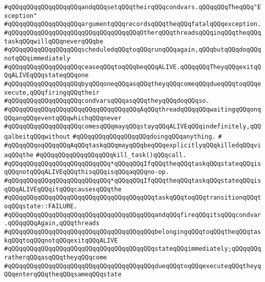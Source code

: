 \verb|#qQQqqQQqqQQqqQQqqQQqandqQQqsetqQQqtheirqQQqcondvars.qQQqqQQqTheqQQq"Exception"|\newline
\verb|#qQQqqQQqqQQqqQQqqQQqargumentqQQqrecordsqQQqtheqQQqfatalqQQqexception.|\newline
\verb|#qQQqqQQqqQQqqQQqqQQqqQQqqQQqqQQqqQQqOtherqQQqthreadsqQQqinqQQqtheqQQqtaskqQQqwillqQQqneverqQQqbe|\newline
\verb|#qQQqqQQqqQQqqQQqqQQqscheduledqQQqtoqQQqrunqQQqagain,qQQqbutqQQqdoqQQqnotqQQqimmediately|\newline
\verb|#qQQqqQQqqQQqqQQqqQQqceaseqQQqtoqQQqbeqQQqALIVE.qQQqqQQqTheyqQQqexitqQQqALIVEqQQqstateqQQqone|\newline
\verb|#qQQqqQQqqQQqqQQqqQQqbyqQQqoneqQQqasqQQqtheyqQQqcomeqQQqdueqQQqtoqQQqexecute,qQQqfiringqQQqtheir|\newline
\verb|#qQQqqQQqqQQqqQQqqQQqcondvarsqQQqasqQQqtheyqQQqdoqQQqso.|\newline
\verb|#qQQqqQQqqQQqqQQqqQQqqQQqqQQqqQQqqQQqAqQQqthreadqQQqqQQqwaitingqQQqonqQQqanqQQqeventqQQqwhichqQQqnever|\newline
\verb|#qQQqqQQqqQQqqQQqqQQqcomesqQQqmayqQQqstayqQQqALIVEqQQqindefinitely,qQQqalbeitqQQqwithout|\newline
\verb|#qQQqqQQqqQQqqQQqqQQqdoingqQQqanything.|\newline
\verb|#|\newline
\verb|#qQQqqQQqoqQQqqQQqAqQQqtaskqQQqmayqQQqbeqQQqexplicitlyqQQqkilledqQQqviaqQQqthe|\newline
\verb|#qQQqqQQqqQQqqQQqqQQqkill_task()qQQqcall.|\newline
\verb|#qQQqqQQqqQQqqQQqqQQqqQQqqQQq*qQQqqQQqIfqQQqtheqQQqtaskqQQqstateqQQqisqQQqnotqQQqALIVEqQQqthisqQQqisqQQqaqQQqno-op.|\newline
\verb|#qQQqqQQqqQQqqQQqqQQqqQQqqQQq*qQQqqQQqIfqQQqtheqQQqtaskqQQqstateqQQqisqQQqALIVEqQQqitqQQqcausesqQQqthe|\newline
\verb|#qQQqqQQqqQQqqQQqqQQqqQQqqQQqqQQqqQQqqQQqtaskqQQqtoqQQqtransitionqQQqtoqQQqstate::FAILURE.|\newline
\verb|#qQQqqQQqqQQqqQQqqQQqqQQqqQQqqQQqqQQqqQQqandqQQqfireqQQqitsqQQqcondvar.qQQqqQQqAgain,qQQqthreads|\newline
\verb|#qQQqqQQqqQQqqQQqqQQqqQQqqQQqqQQqqQQqqQQqbelongingqQQqtoqQQqtheqQQqtaskqQQqtoqQQqnotqQQqexitqQQqALIVE|\newline
\verb|#qQQqqQQqqQQqqQQqqQQqqQQqqQQqqQQqqQQqqQQqstateqQQqimmediately;qQQqqQQqratherqQQqasqQQqtheyqQQqcome|\newline
\verb|#qQQqqQQqqQQqqQQqqQQqqQQqqQQqqQQqqQQqqQQqdueqQQqtoqQQqexecuteqQQqtheyqQQqenterqQQqtheqQQqsameqQQqstate|\newline
